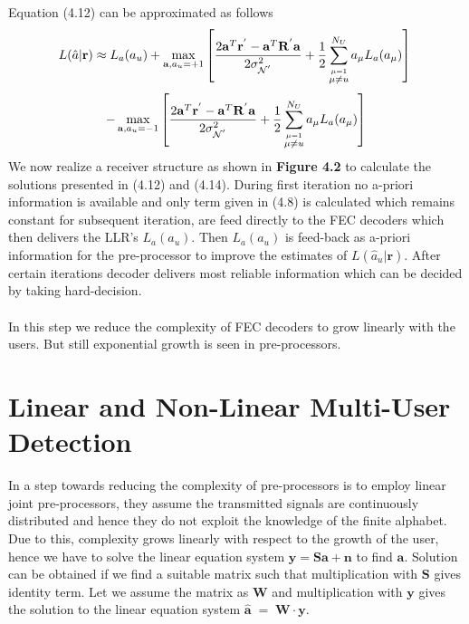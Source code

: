 Equation (4.12) can be approximated as follows
\begin{equation*}
L(\hat{a}\vert \mathrm{\mathbf{r}})\approx L_a(a_u)
+\max_{\mathrm{\mathbf{a}},a_u=+1}\left[ \frac{\hbox{$2\mathrm{\mathbf{a}}^T\mathrm{\mathbf{r}}^{'}-\mathrm{\mathbf{a}}^T\mathrm{\mathbf{R}}^{'}\mathrm{\mathbf{a}}$}}{\hbox{$2\sigma^2_{\mathcal{N}^{'}}$}}+\frac{\hbox{$1$}}{\hbox{$2$}} \sum\limits_{\stackrel{\mu=1}{\mu \ne u}}^{N_U}a_{\mu}L_a(a_\mu) \right] \\ \\
\end{equation*}
\begin{equation}
-\max_{\mathrm{\mathbf{a}},a_u=-1}\left[ \frac{\hbox{$2\mathrm{\mathbf{a}}^T\mathrm{\mathbf{r}}^{'}-\mathrm{\mathbf{a}}^T\mathrm{\mathbf{R}}^{'}\mathrm{\mathbf{a}}$}}{\hbox{$2\sigma^2_{\mathcal{N}^{'}}$}}+\frac{\hbox{$1$}}{\hbox{$2$}} \sum\limits_{\stackrel{\mu=1}{\mu \ne u}}^{N_U}a_{\mu}L_a(a_\mu) \right]
\end{equation}
We now realize a receiver structure as shown in \textbf{Figure 4.2} to calculate the solutions presented in (4.12) and (4.14). During first iteration no a-priori information is available and only term given in (4.8) is calculated which remains constant for subsequent iteration, are feed directly to the FEC decoders which then delivers the LLR's $L_a(a_u)$. Then $L_a(a_u)$ is feed-back as a-priori information for the pre-processor to improve the estimates of $L(\hat{a}_u\vert \mathrm{\mathbf{r}})$. After certain iterations decoder delivers most reliable information which can be decided by taking hard-decision.\\ \\
In this step we reduce the complexity of FEC decoders to grow linearly with the users. But still exponential growth is seen in pre-processors.
\section{Linear and Non-Linear Multi-User Detection}
In a step towards reducing the complexity of pre-processors is to employ linear joint pre-processors, they assume the transmitted signals are continuously distributed and hence they do not exploit the knowledge of the finite alphabet. Due to this, complexity grows linearly with respect to the growth of the user, hence we have to solve the linear equation system $\mathrm{\mathbf{y}}=\mathrm{\mathbf{S}}\mathrm{\mathbf{a}}+\mathrm{\mathbf{n}}$ to find $\mathrm{\mathbf{a}}$. Solution can be obtained if we find a suitable matrix such that multiplication with $\mathrm{\mathbf{S}}$ gives identity term. Let we assume the matrix as $\mathrm{\mathbf{W}}$ and multiplication with $\mathrm{\mathbf{y}}$ gives the solution to the linear equation system $\mathrm{\mathbf{\hat{a}}}\;=\;\mathrm{\mathbf{W}}\cdot\mathrm{\mathbf{y}}$.
